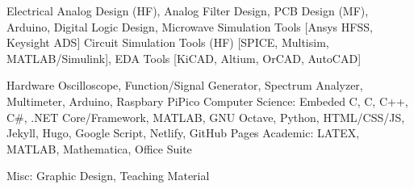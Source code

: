 

\begin{cvskills}

  \cvskill
    {Electrical} %
    {Analog Design (HF), Analog Filter Design, PCB Design (MF),
Arduino, Digital Logic Design, Microwave Simulation Tools [Ansys HFSS, Keysight ADS] Circuit Simulation Tools (HF) [SPICE, Multisim, MATLAB/Simulink], EDA Tools [KiCAD, Altium, OrCAD, AutoCAD]} %

\cvskill
    {Hardware}
    {Oscilloscope, Function/Signal Generator, Spectrum Analyzer, Multimeter, Arduino, Raspbary PiPico }
  \cvskill
    {Computer Science:} %
    {Embeded C, C, C++, C\#, .NET Core/Framework, MATLAB, GNU Octave, Python, HTML/CSS/JS, Jekyll, Hugo, Google Script, Netlify, GitHub Pages} %
  \cvskill
    {Academic:} %
    {LATEX, MATLAB, Mathematica, Office Suite} %


  \cvskill
    {Misc:} %
    {Graphic Design, Teaching Material} %
\end{cvskills}